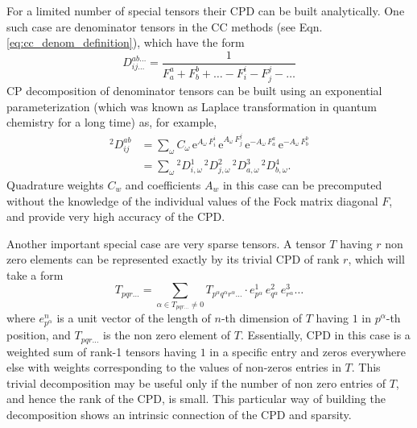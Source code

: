 For a limited number of special tensors their CPD can be built analytically. 
One such case are denominator tensors in the CC methods (see Eqn. 
\ref{eq:cc_denom_definition}), which have the form
\begin{equation}
D^{ab\ldots}_{ij\ldots} = 
\frac{1}{F_{a}^{a} + F_{b}^{b} + \ldots - F_{i}^{i} - 
F_{j}^{j} - \ldots}
\end{equation}
CP decomposition of denominator tensors can be built using an exponential
parameterization\cite{braess2005approximation} (which was known as Laplace
transformation in quantum chemistry for a long 
time\cite{almlof1991elimination}) as, for example,
%
\begin{subequations}
\begin{align} {}^2D_{ij}^{ab} &= 
\sum_{\omega} C_\omega \, \mathrm{e}^{A_\omega \,
F_i^i} \, \mathrm{e}^{A_\omega \, F_j^j} \, \mathrm{e}^{-A_\omega \,
F_a^a} \, \mathrm{e}^{-A_\omega \, F_b^b} \\ &= \sum_{\omega} {}^2D^1_{i,\omega} 
\,
{}^2D^2_{j,\omega} \, {}^2D^3_{a,\omega} \, {}^2D^4_{b,\omega}.
\end{align}
\end{subequations}
%
Quadrature weights $C_{w}$ and coefficients $A_{w}$ in this case can be 
precomputed without the knowledge of the individual values of the Fock matrix 
diagonal $F$, and provide very high accuracy of the 
CPD.\cite{braess2005approximation}

Another important special case are very sparse tensors. A tensor $T$ having $r$
non zero elements can be represented exactly by its trivial CPD of rank $r$, 
which will take a form
\begin{equation}
T_{pqr\ldots} = \sum_{\alpha \in T_{pqr\ldots} \neq 0} T_{p^\alpha q^{\alpha} 
r^{\alpha}\ldots} \cdot e^{1}_{p^{\alpha}} \, e^{2}_{q^\alpha} \, 
e^{3}_{r^\alpha} \ldots
\label{eq:trivial_cpd_dec}
\end{equation}
where $e^{n}_{p^{\alpha}}$ is a unit vector of the length of $n$-th dimension 
of $T$ having $1$ in $p^{\alpha}$-th position, and $T_{pqr\ldots}$ is the non 
zero element of $T$. Essentially, CPD in this case is a weighted sum of rank-1 
tensors having $1$ in a specific entry and zeros everywhere else with 
weights corresponding to the values of non-zeros entries in $T$. This trivial 
decomposition may be useful only if the number of non zero entries of $T$, and 
hence the rank of the CPD, is small. This particular way of building the 
decomposition shows an intrinsic connection of the CPD and sparsity.

